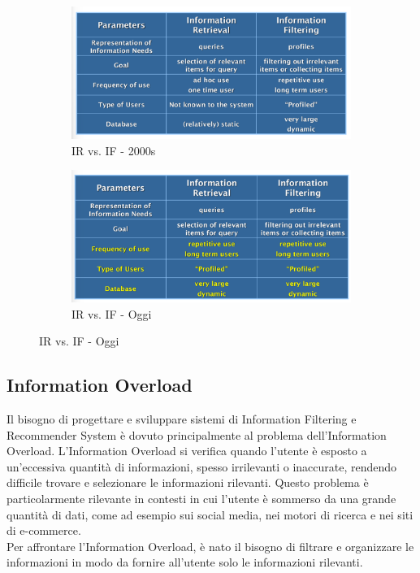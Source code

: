 \documentclass{report}
\begin{document}
	\begin{figure}[H]
		\begin{subfigure}{0.3\textwidth}
			\centering
			\includegraphics[scale=0.3]{assets/ir-vs-if-2001.png}
			\caption{IR vs. IF - 2000s}
			\label{fig:immagine1}
		\end{subfigure}
		\hspace{0.2\textwidth}
		\begin{subfigure}{0.3\textwidth}
			\centering
			\includegraphics[scale=0.3]{assets/ir-vs-if-oggi.png}
			\caption{IR vs. IF - Oggi}
			\label{fig:immagine2}
		\end{subfigure}
	\end{figure}

	\subsection{Information Overload}
	Il bisogno di progettare e sviluppare sistemi di Information Filtering e Recommender System è dovuto principalmente al problema dell'Information Overload. L'Information Overload si verifica quando l'utente è esposto a un'eccessiva quantità di informazioni, spesso irrilevanti o inaccurate, rendendo difficile trovare e selezionare le informazioni rilevanti. Questo problema è particolarmente rilevante in contesti in cui l'utente è sommerso da una grande quantità di dati, come ad esempio sui social media, nei motori di ricerca e nei siti di e-commerce.
	\vspace{\baselineskip}\\
	Per affrontare l'Information Overload, è nato il bisogno di filtrare e organizzare le informazioni in modo da fornire all'utente solo le informazioni rilevanti.
\end{document}
